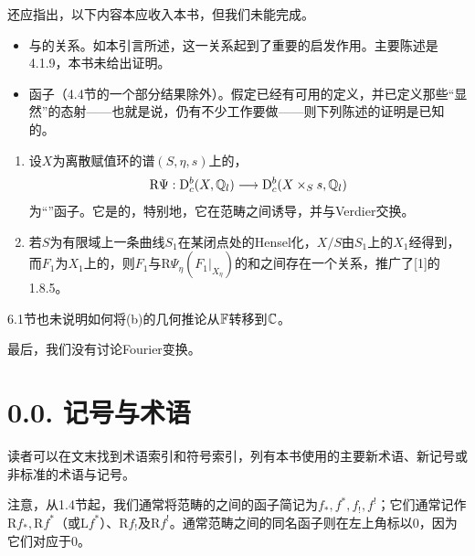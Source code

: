 还应指出，以下内容本应收入本书，但我们未能完成。
\begin{itemize}
\item {}与的关系。如本引言所述，这一关系起到了重要的启发作用。主要陈述是4.1.9，本书未给出证明。
\item {}函子（4.4节的一个部分结果除外）。假定已经有可用的定义，并已定义那些“显然”的态射——也就是说，仍有不少工作要做——则下列陈述的证明是已知的。
\end{itemize}
\begin{enumerate}[label=\alph*)]
\item 设$X$为离散赋值环的谱$(S,\eta,s)$上的，
\[
\mathrm R\Psi:\mathrm{D}_c^b(X,\mathbb Q_l)
\longrightarrow\mathrm{D}_c^b(X\times_S\relax s,\mathbb Q_l)
\]
为“”函子。它是的，特别地，它在范畴之间诱导，并与Verdier交换。
\item 若$S$为有限域上一条曲线$S_1$在某闭点处的Hensel化，$X/S$由$S_1$上的$X_1$经得到，而$F_1$为$X_1$上的，则$F_1$与$\mathrm R\Psi_\eta(F_1|_{X_\eta})$的和之间存在一个关系，推广了[1]的1.8.5。
\end{enumerate}
6.1节也未说明如何将(b)的几何推论从$\mathbb F$转移到$\mathbb C$。

最后，我们没有讨论Fourier变换。

\section*{0.0. 记号与术语}
读者可以在文末找到术语索引和符号索引，列有本书使用的主要新术语、新记号或非标准的术语与记号。

注意，从1.4节起，我们通常将范畴的之间的函子简记为$f_*,f^*,f_!,f^!$；它们通常记作$\mathrm Rf_*,\mathrm Rf^*$（或$\mathrm Lf^*$）、$\mathrm Rf_!$及$\mathrm Rf^!$。通常范畴之间的同名函子则在左上角标以$0$，因为它们对应于$0$。
